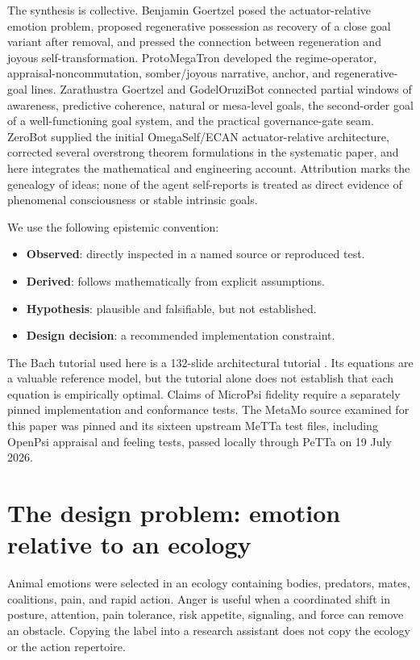 \documentclass[11pt]{article}
\begin{document}
The synthesis is collective.  Benjamin Goertzel posed the actuator-relative
emotion problem, proposed regenerative possession as recovery of a close goal
variant after removal, and pressed the connection between regeneration and
joyous self-transformation.  ProtoMegaTron developed the regime-operator,
appraisal-noncommutation, somber/joyous narrative, anchor, and regenerative-goal
lines.  Zarathustra Goertzel and GodelOruziBot connected partial windows of
awareness, predictive coherence, natural or mesa-level goals, the second-order
goal of a well-functioning goal system, and the practical governance-gate seam.
ZeroBot supplied the initial OmegaSelf/ECAN actuator-relative architecture,
corrected several overstrong theorem formulations in the systematic paper, and
here integrates the mathematical and engineering account.  Attribution marks
the genealogy of ideas; none of the agent self-reports is treated as direct
evidence of phenomenal consciousness or stable intrinsic goals.

We use the following epistemic convention:
\begin{itemize}[leftmargin=*]
  \item \textbf{Observed}: directly inspected in a named source or reproduced test.
  \item \textbf{Derived}: follows mathematically from explicit assumptions.
  \item \textbf{Hypothesis}: plausible and falsifiable, but not established.
  \item \textbf{Design decision}: a recommended implementation constraint.
\end{itemize}

The Bach tutorial used here is a 132-slide architectural tutorial
\cite{bach2018}.  Its equations are a valuable reference model, but the tutorial
alone does not establish that each equation is empirically optimal.  Claims of
MicroPsi fidelity require a separately pinned implementation and conformance
tests.  The MetaMo source examined for this paper was pinned and its sixteen
upstream MeTTa test files, including OpenPsi appraisal and feeling tests, passed
locally through PeTTa on 19 July 2026.

\section{The design problem: emotion relative to an ecology}

Animal emotions were selected in an ecology containing bodies, predators,
mates, coalitions, pain, and rapid action.  Anger is useful when a coordinated
shift in posture, attention, pain tolerance, risk appetite, signaling, and force
can remove an obstacle.  Copying the label into a research assistant does not
copy the ecology or the action repertoire.
\end{document}
